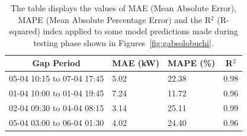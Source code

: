 \begin{table}[H]
	\begin{center}
		\begin{tabular}[c]{l|l|l|l}
			\multicolumn{1}{c|}{\textbf{Gap Period}} &
			\multicolumn{1}{c|}{\textbf{MAE (kW)}}   &
			\multicolumn{1}{c|}{\textbf{MAPE (\%)}}  &                     %
			\multicolumn{1}{c}{\textbf{R}$^2$}                             \\
			\hline

			05-04 10:15 to 07-04 17:45               & 5.02 & 22.38 & 0.98 \\
			01-04 10:00 to 01-04 19:45               & 7.24 & 11.72 & 0.96 \\
			02-04 09:30 to 04-04 08:15               & 3.14 & 25.11 & 0.99 \\
			05-04 03:00 to 06-04 01:30               & 4.02 & 24.40 & 0.96 \\
		\end{tabular}
	\end{center}
	\caption{The table displays the values of MAE (Mean Absolute Error), MAPE (Mean Absolute Percentage Error) and the R$^2$ (R-squared) index applied to some model predictions made during testing phase shown in Figures~\ref{fig:gabsolobuchi}.}\label{tab:gabpmaer}
\end{table}

